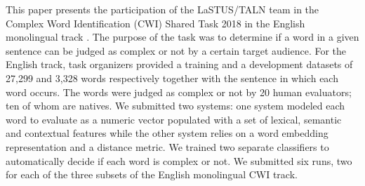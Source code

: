 This paper presents the participation of the LaSTUS/TALN team in the Complex Word Identification (CWI) Shared Task 2018 in the English monolingual track . The purpose of the task was to determine if a word in a given sentence can be judged as complex or not by a certain target audience. For the English track, task organizers provided a training and a development datasets of 27,299 and 3,328 words respectively together with the sentence in which each word occurs. The words were judged as complex or not by 20 human evaluators; ten of whom are natives. We  submitted two systems: one system modeled each word to evaluate as a numeric vector populated with a set of lexical, semantic and contextual features while the other system relies on a word embedding representation and a distance metric. We trained two separate classifiers to automatically decide if each word is complex or not. We submitted six runs, two for each of the three subsets of the English monolingual CWI track.
